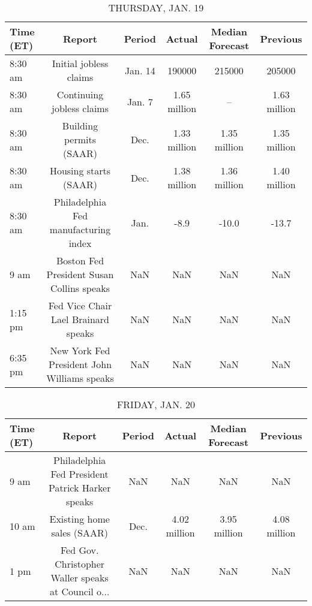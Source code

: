\documentclass{article}%
\begin{document}
\begin{table}[htbp]%
\caption{THURSDAY, JAN. 19}%
\centering%
\begin{adjustbox}{width=1\textwidth}%
\begin{tabular}{lccccc}
\toprule
Time (ET) &                                      Report &  Period &       Actual & Median Forecast &     Previous \\
\midrule
  8:30 am &                      Initial jobless claims & Jan. 14 &       190000 &          215000 &       205000 \\
  8:30 am &                   Continuing jobless claims &  Jan. 7 & 1.65 million &              -- & 1.63 million \\
  8:30 am &                     Building permits (SAAR) &    Dec. & 1.33 million &    1.35 million & 1.35 million \\
  8:30 am &                       Housing starts (SAAR) &    Dec. & 1.38 million &    1.36 million & 1.40 million \\
  8:30 am &        Philadelphia Fed manufacturing index &    Jan. &         -8.9 &           -10.0 &        -13.7 \\
     9 am &   Boston Fed President Susan Collins speaks &     NaN &          NaN &             NaN &          NaN \\
  1:15 pm &         Fed Vice Chair Lael Brainard speaks &     NaN &          NaN &             NaN &          NaN \\
  6:35 pm & New York Fed President John Williams speaks &     NaN &          NaN &             NaN &          NaN \\
\bottomrule
\end{tabular}
%
\end{adjustbox}%
\end{table}

%


\begin{table}[htbp]%
\caption{FRIDAY, JAN. 20}%
\centering%
\begin{adjustbox}{width=1\textwidth}%
\begin{tabular}{lccccc}
\toprule
Time (ET) &                                             Report & Period &       Actual & Median Forecast &     Previous \\
\midrule
     9 am &   Philadelphia Fed President Patrick Harker speaks &    NaN &          NaN &             NaN &          NaN \\
    10 am &                         Existing home sales (SAAR) &   Dec. & 4.02 million &    3.95 million & 4.08 million \\
     1 pm & Fed Gov. Christopher Waller speaks at Council o... &    NaN &          NaN &             NaN &          NaN \\
\bottomrule
\end{tabular}
%
\end{adjustbox}%
\end{table}
\end{document}
